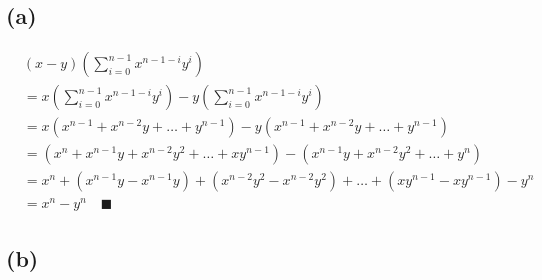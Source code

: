 \documentclass[12pt,a4paper]{article}
\theoremstyle{definition}
\theoremstyle{remark}
\begin{document}
\subsection*{(a)}
\begin{align*}
& (x - y) \left( \sum_{i=0}^{n-1} x^{n-1-i}y^i \right) \\
&= x \left( \sum_{i=0}^{n-1} x^{n-1-i}y^i \right) - y \left( \sum_{i=0}^{n-1} x^{n-1-i}y^i \right) \\
&= x(x^{n-1} + x^{n-2}y + \dots + y^{n-1}) - y(x^{n-1} + x^{n-2}y + \dots + y^{n-1}) \\
&= (x^n + x^{n-1}y + x^{n-2}y^2 + \dots + xy^{n-1}) - (x^{n-1}y + x^{n-2}y^2 + \dots + y^n) \\
&= x^n + (x^{n-1}y - x^{n-1}y) + (x^{n-2}y^2 - x^{n-2}y^2) + \dots + (xy^{n-1} - xy^{n-1}) - y^n \\
&= x^n - y^n \quad \blacksquare
\end{align*}

\subsection*{(b)}
\end{document}
